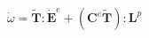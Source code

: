 \documentclass[preview]{standalone}
\begin{document}
\begin{align*}
\dot{\omega} = \tilde{\mathbf{T}} : \dot{\mathbf{E}}^e + ( \mathbf{C}^e \tilde{\mathbf{T}} ) : \mathbf{L}^p
\end{align*}
\end{document}
